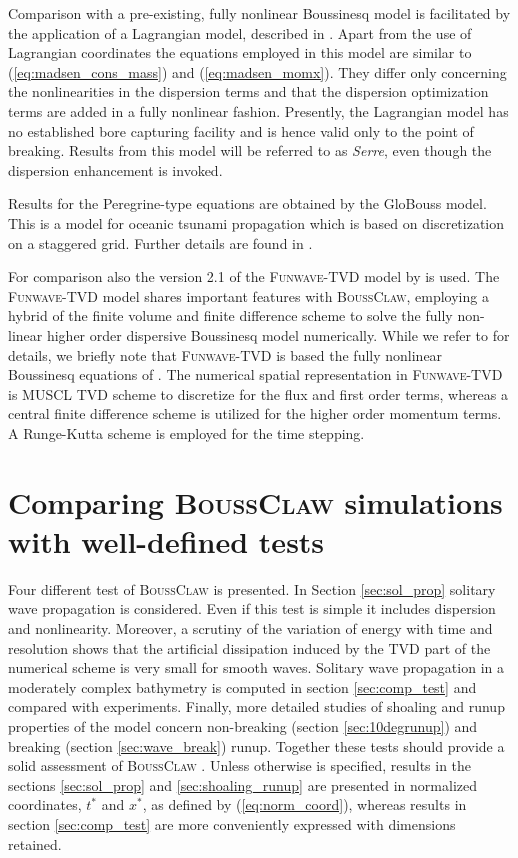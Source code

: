 \documentclass[review]{elsarticle}
\newcommand{\BoussClaw}{\textsc{BoussClaw} }
\newcommand{\BoussClawt}{\textsc{BoussClaw}}
\begin{document}
Comparison with a pre-existing, fully nonlinear Boussinesq model is
facilitated by the application of a Lagrangian model, described
in \citet{Lovholt:2013a}. Apart from the use of
Lagrangian coordinates the equations employed in this model are
 similar to (\ref{eq:madsen_cons_mass}) and (\ref{eq:madsen_momx}).
They differ only concerning the nonlinearities in the
dispersion terms and that  the dispersion optimization terms are added in a fully nonlinear fashion.
Presently, the Lagrangian model has no established bore capturing 
facility and is hence valid only to the point of breaking.
Results from this model will be referred to as {\em Serre}, even though
the dispersion enhancement is invoked. 
 
Results for the Peregrine-type equations are obtained by the
GloBouss model. This is a model for oceanic tsunami propagation which
is based on  discretization on a staggered grid. Further details are found in 
\citet{Lovholt:2008b}.

For comparison also the version 2.1 of the  \textsc{Funwave-TVD} model
by \citet{shi2012high} is used. The
\textsc{Funwave-TVD} model shares important features with \BoussClawt, employing a hybrid 
of the finite volume and finite difference
scheme to solve the fully non-linear higher order dispersive Boussinesq model numerically.
While we refer to \citet{shi2012high} for details, we briefly note that \textsc{Funwave-TVD} is based the fully nonlinear 
Boussinesq equations of \citet{Chen06}. The numerical spatial representation in \textsc{Funwave-TVD} is MUSCL TVD scheme 
to discretize for the flux and first order terms, 
whereas a central finite difference
scheme \citep{Wei95} is utilized for the higher order momentum terms. A Runge-Kutta scheme is employed for the time stepping.

\section{Comparing \BoussClaw simulations with well-defined tests}
\label{sec:num_tests}
Four different test of \BoussClaw is presented.  
In Section \ref{sec:sol_prop} solitary wave propagation is considered.
Even if this test is simple it includes dispersion and nonlinearity. 
Moreover, a scrutiny of the variation of energy with time and resolution  shows that the artificial dissipation induced by the TVD part of the numerical scheme
 is very small for smooth waves.
Solitary wave propagation in a moderately complex bathymetry is
computed in  section \ref{sec:comp_test} and compared with experiments.
Finally, more detailed studies of shoaling and runup properties
of the model concern non-breaking (section \ref{sec:10degrunup}) and 
breaking (section \ref{sec:wave_break}) runup. Together these
tests should provide a solid assessment of  \BoussClaw. Unless otherwise 
is specified, results in  the sections 
  \ref{sec:sol_prop}    and \ref{sec:shoaling_runup} are presented  in 
normalized coordinates, $t^*$ and $x^*$, as defined by (\ref{eq:norm_coord}),
whereas results in section \ref{sec:comp_test} are more conveniently expressed with 
dimensions retained.
\end{document}
